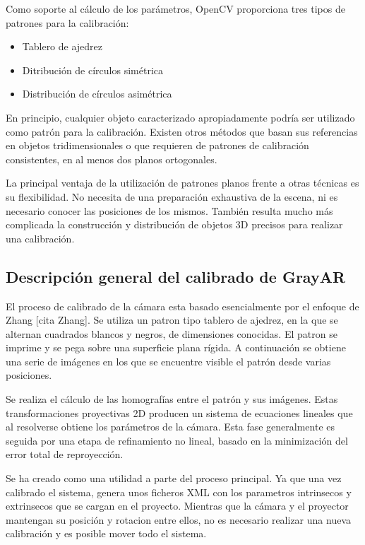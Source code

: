 Como soporte al cálculo de los parámetros, OpenCV proporciona tres tipos de patrones para la calibración:

\begin{itemize}
\item Tablero de ajedrez
\item Ditribución de círculos simétrica
\item Distribución de círculos asimétrica 
\end{itemize}

En principio, cualquier objeto caracterizado apropiadamente podría ser utilizado como patrón para la calibración. Existen otros métodos que basan sus referencias en objetos tridimensionales o que requieren de patrones de calibración consistentes, en al menos dos planos ortogonales. 

La principal ventaja de la utilización de patrones planos frente a otras técnicas es su flexibilidad. No necesita de una preparación exhaustiva de la escena, ni es necesario conocer las posiciones de los mismos. También resulta mucho más complicada la construcción y distribución de objetos 3D precisos para realizar una calibración.

\subsection{Descripción general del calibrado de GrayAR}
El proceso de calibrado de la cámara esta basado esencialmente por el enfoque de Zhang [cita Zhang]. Se utiliza un patron tipo tablero de ajedrez, en la que se alternan cuadrados blancos y negros, de dimensiones conocidas. El patron se imprime y se pega sobre una superficie plana rígida. A continuación se obtiene una serie de imágenes en los que se encuentre visible el patrón desde varias posiciones. 

Se realiza el cálculo de las homografías entre el patrón y sus imágenes. Estas transformaciones proyectivas 2D producen un sistema de ecuaciones lineales que al resolverse obtiene los parámetros de la cámara. Esta fase generalmente es seguida por una etapa de refinamiento no lineal, basado en la minimización del error total de reproyección.

Se ha creado como una utilidad a parte del proceso principal. Ya que una vez calibrado el sistema, genera unos ficheros XML con los parametros intrinsecos y extrinsecos que se cargan en el proyecto. Mientras que la cámara y el proyector mantengan su posición y rotacion entre ellos, no es necesario realizar una nueva calibración y es posible mover todo el sistema.

